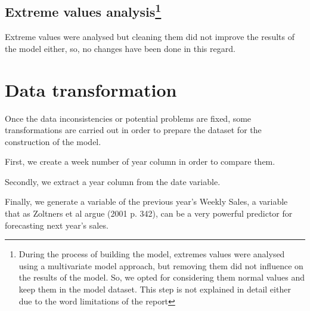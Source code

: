 \documentclass[11pt,]{article}
\newenvironment{Shaded}{\begin{snugshade}}{\end{snugshade}}
\newcommand{\KeywordTok}[1]{\textcolor[rgb]{0.13,0.29,0.53}{\textbf{{#1}}}}
\newcommand{\DecValTok}[1]{\textcolor[rgb]{0.00,0.00,0.81}{{#1}}}
\newcommand{\StringTok}[1]{\textcolor[rgb]{0.31,0.60,0.02}{{#1}}}
\newcommand{\CommentTok}[1]{\textcolor[rgb]{0.56,0.35,0.01}{\textit{{#1}}}}
\newcommand{\NormalTok}[1]{{#1}}
\let\rmarkdownfootnote\footnote%
\def\footnote{\protect\rmarkdownfootnote}
\begin{document}
\subsection[Extreme values analysis]{\texorpdfstring{Extreme values
analysis\footnote{During the process of building the model, extremes
  values were analysed using a multivariate model approach, but removing
  them did not influence on the results of the model. So, we opted for
  considering them normal values and keep them in the model dataset.
  This step is not explained in detail either due to the word
  limitations of the report}}{Extreme values analysis}}\label{extreme-values-analysis}

Extreme values were analysed but cleaning them did not improve the
results of the model either, so, no changes have been done in this
regard.

\section{Data transformation}\label{data-transformation}

Once the data inconsistencies or potential problems are fixed, some
transformations are carried out in order to prepare the dataset for the
construction of the model.

First, we create a week number of year column in order to compare them.

\begin{Shaded}
\end{Shaded}

Secondly, we extract a year column from the date variable.

\begin{Shaded}
\end{Shaded}

Finally, we generate a variable of the previous year's Weekly Sales, a
variable that as Zoltners et al argue (2001 p. 342), can be a very
powerful predictor for forecasting next year's sales.
\end{document}
